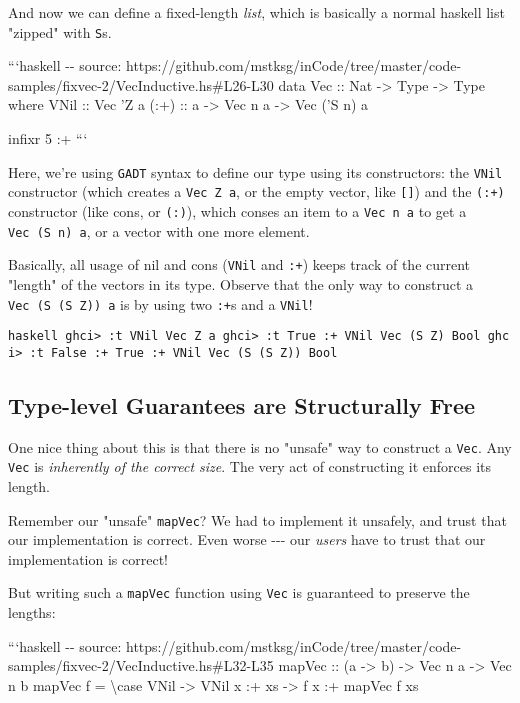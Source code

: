 \documentclass[]{article}
\begin{document}
And now we can define a fixed-length \emph{list}, which is basically a normal
haskell list "zipped" with \texttt{S}s.

```haskell -\/- source:
https://github.com/mstksg/inCode/tree/master/code-samples/fixvec-2/VecInductive.hs\#L26-L30
data Vec :: Nat -\textgreater{} Type -\textgreater{} Type where VNil :: Vec 'Z a
(:+) :: a -\textgreater{} Vec n a -\textgreater{} Vec ('S n) a

infixr 5 :+ ```

Here, we're using \texttt{GADT} syntax to define our type using its
constructors: the \texttt{VNil} constructor (which creates a
\texttt{Vec\ \textquotesingle{}Z\ a}, or the empty vector, like \texttt{{[}{]}})
and the \texttt{(:+)} constructor (like cons, or \texttt{(:)}), which conses an
item to a \texttt{Vec\ n\ a} to get a \texttt{Vec\ (\textquotesingle{}S\ n)\ a},
or a vector with one more element.

Basically, all usage of nil and cons (\texttt{VNil} and \texttt{:+}) keeps track
of the current "length" of the vectors in its type. Observe that the only way to
construct a
\texttt{Vec\ (\textquotesingle{}S\ (\textquotesingle{}S\ \textquotesingle{}Z))\ a}
is by using two \texttt{:+}s and a \texttt{VNil}!

\texttt{haskell\ ghci\textgreater{}\ :t\ VNil\ Vec\ \textquotesingle{}Z\ a\ ghci\textgreater{}\ :t\ True\ :+\ VNil\ Vec\ (\textquotesingle{}S\ \textquotesingle{}Z)\ Bool\ ghci\textgreater{}\ :t\ False\ :+\ True\ :+\ VNil\ Vec\ (\textquotesingle{}S\ (\textquotesingle{}S\ \textquotesingle{}Z))\ Bool}

\subsection{Type-level Guarantees are Structurally Free}

One nice thing about this is that there is no "unsafe" way to construct a
\texttt{Vec}. Any \texttt{Vec} is \emph{inherently of the correct size}. The
very act of constructing it enforces its length.

Remember our "unsafe" \texttt{mapVec}? We had to implement it unsafely, and
trust that our implementation is correct. Even worse -\/-\/- our \emph{users}
have to trust that our implementation is correct!

But writing such a \texttt{mapVec} function using \texttt{Vec} is guaranteed to
preserve the lengths:

```haskell -\/- source:
https://github.com/mstksg/inCode/tree/master/code-samples/fixvec-2/VecInductive.hs\#L32-L35
mapVec :: (a -\textgreater{} b) -\textgreater{} Vec n a -\textgreater{} Vec n b
mapVec f = \textbackslash{}case VNil -\textgreater{} VNil x :+ xs
-\textgreater{} f x :+ mapVec f xs
\end{document}
